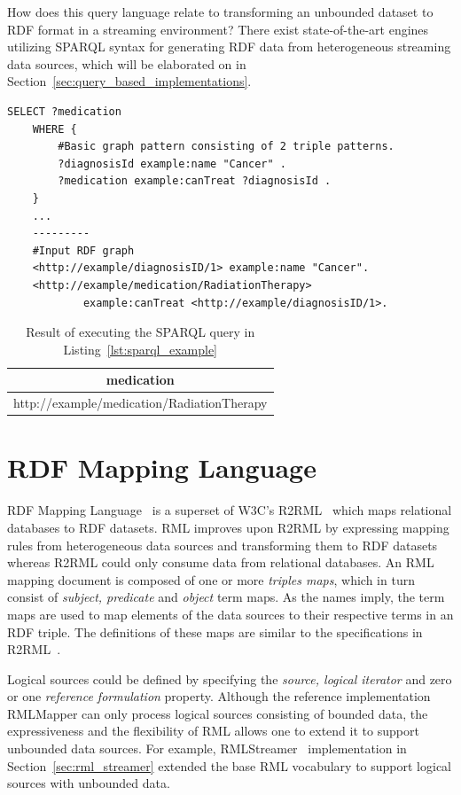 How does this query language relate to transforming an 
unbounded dataset to RDF format in a streaming environment? There exist state-of-the-art 
engines utilizing SPARQL syntax for generating RDF data from heterogeneous streaming data sources, which will be 
elaborated on in Section~\ref{sec:query_based_implementations}. 

\begin{lstlisting}[language=SPARQL,
    caption={Example of a SPARQL query of a medication on the given input.}, 
    label={lst:sparql_example}]
    SELECT ?medication
    WHERE {
        #Basic graph pattern consisting of 2 triple patterns. 
        ?diagnosisId example:name "Cancer" .
        ?medication example:canTreat ?diagnosisId .
    }
    ...
    ---------
    #Input RDF graph
    <http://example/diagnosisID/1> example:name "Cancer". 
    <http://example/medication/RadiationTherapy> 
            example:canTreat <http://example/diagnosisID/1>.
\end{lstlisting}
\begin{table}[!htbp]
    \centering
    \begin{tabular}{|c|}
    \hline
    \textbf{medication}        \\ \hline
    http://example/medication/RadiationTherapy\\ \hline
    \end{tabular}
    \caption{Result of executing the SPARQL query in Listing~\ref{lst:sparql_example}}
    \label{tab:sparql_result}
\end{table}


\section{RDF Mapping Language}
RDF Mapping Language~\cite{rml} is a superset of W3C's R2RML~\cite{r2rml} which maps relational databases to
RDF datasets. RML improves upon R2RML by expressing mapping rules from heterogeneous
data sources and transforming them to RDF datasets whereas R2RML could only consume
data from relational databases. An RML mapping document is composed of one or more \emph{triples maps}, 
which in turn consist of \emph{subject, predicate} and \emph{object} term maps. As the names imply, 
the term maps are used to map elements of the data sources to their respective terms 
in an RDF triple. The definitions of these maps are similar to the 
specifications in R2RML~\cite{rml_tech}. 

Logical sources could be defined by specifying the \emph{source, logical iterator} 
and zero or one \emph{reference formulation} property.
Although the reference implementation RMLMapper can only process logical sources 
consisting of bounded data, the expressiveness and the flexibility of RML allows one 
to extend it to support unbounded data sources. For example, RMLStreamer~\cite{rml_streamer} implementation in 
Section~\ref{sec:rml_streamer} extended the base RML vocabulary to support logical sources with unbounded data. 

